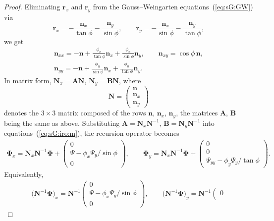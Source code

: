 \documentclass[pdftex]{sigma}
\let\ve\mathbf
\def\eqref#1{{\rm(\ref{#1})}}
\numberwithin{equation}{section}
\theoremstyle{definition}
\begin{document}
\begin{proof}
Eliminating $\ve r_x$ and $\ve r_y$ from the Gauss--Weingarten
equations~\eqref{eq:sG:GW} via
\[
\ve r_x = -\frac{\ve n_x}{\tan\phi} - \frac{\ve n_y}{\sin\phi},
\qquad
\ve r_y = -\frac{\ve n_x}{\sin\phi} - \frac{\ve n_y}{\tan\phi},
\]
we get
\begin{gather*}
\ve n_{xx} = -\ve n
 + \frac{\phi_x}{\tan \phi} \ve n_x
 + \frac{\phi_x}{\sin \phi} \ve n_y,
\qquad
\ve n_{xy} = \cos \phi\, \ve n,
\\
\ve n_{yy} = -\ve n
 + \frac{\phi_y}{\sin \phi} \ve n_x
 + \frac{\phi_y}{\tan \phi} \ve n_y.
\end{gather*}
In matrix form,
$
\mathbf N_{x}
 = \mathbf A \mathbf N$, $
\mathbf N_{y}
 = \mathbf B
\mathbf N$,
where
\[
\mathbf N = \left(\begin{matrix}
 \ve n \\ \ve n_{x} \\ \ve n_{y}
\end{matrix}\right)
\]
denotes the $3\times3$ matrix composed of the rows
$\ve n$, $\ve n_x$, $\ve n_y$,
the matrices $\mathbf A$, $\mathbf B$ being the same as above.
Substituting
$
\mathbf A = \mathbf N_x \mathbf N^{-1}$, $
\mathbf B = \mathbf N_y \mathbf N^{-1}
$
into equations~\eqref{eq:sG:iro:m}, the recursion operator becomes
\begin{gather*}
\mathbf \Phi_x
 = \mathbf N_x \mathbf N^{-1} \mathbf \Phi
+ \left(\begin{matrix}
 0 \\
 \Psi - \phi_x\Psi_y/{\sin\phi} \\
 0
\end{matrix}\right),
\qquad
\mathbf \Phi_y
 = \mathbf N_x \mathbf N^{-1} \mathbf \Phi
+ \left(\begin{matrix}
 0 \\
 0 \\
 \Psi_{yy} - \phi_y \Psi_y/{\tan\phi}
\end{matrix}\right).
\end{gather*}
Equivalently,
\begin{gather}
\bigl(\mathbf N^{-1} \mathbf \Phi\bigr)_x
 = \mathbf N^{-1} \left(\begin{matrix}
 0 \\
 \Psi - \phi_x\Psi_y/{\sin\phi} \\
 0
\end{matrix}\right),
\qquad
\bigl(\mathbf N^{-1} \mathbf \Phi\bigr)_y
 = \mathbf N^{-1} \left(\begin{matrix}
 0 \\

\end{matrix}
\end{gather}
\end{proof}
\end{document}
